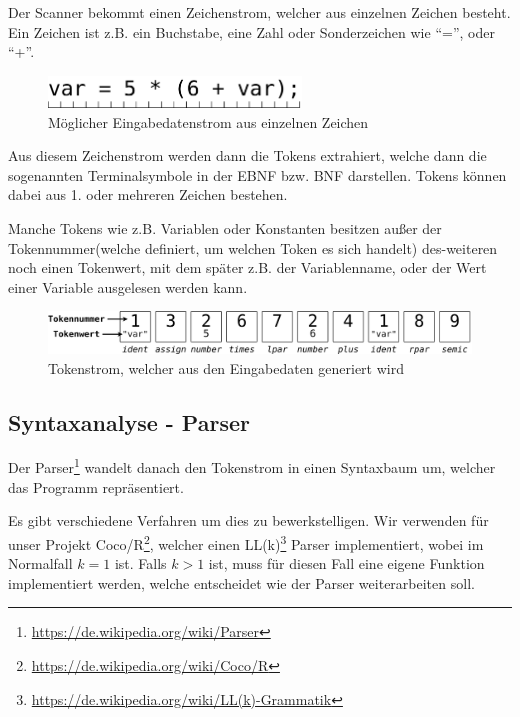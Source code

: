
Der Scanner bekommt einen Zeichenstrom, welcher aus einzelnen Zeichen besteht. Ein Zeichen ist z.B. ein Buchstabe, eine Zahl oder Sonderzeichen wie ``='', oder ``+''.

\begin{figure}[h]
\centering
\includegraphics[width=0.6\textwidth]{./media/images/compiler/input_characterstream.png}
\caption{M\"oglicher Eingabedatenstrom aus einzelnen Zeichen}
\label{compiler_input_characterstream}
\end{figure}


Aus diesem Zeichenstrom werden dann die Tokens extrahiert, welche dann die sogenannten Terminalsymbole in der EBNF bzw. BNF darstellen. Tokens k\"onnen dabei aus 1. oder mehreren Zeichen bestehen.

Manche Tokens wie z.B. Variablen oder Konstanten besitzen au\ss{}er der Tokennummer(welche definiert, um welchen Token es sich handelt) des-weiteren noch einen Tokenwert, mit dem sp\"ater z.B. der Variablenname, oder der Wert einer Variable ausgelesen werden kann.

\begin{figure}[h]
\centering
\includegraphics[width=\textwidth]{./media/images/compiler/scanner_tokenstream.png}
\caption{Tokenstrom, welcher aus den Eingabedaten generiert wird}
\label{compiler_scanner_tokenstream}
\end{figure}

\subsection{Syntaxanalyse - Parser}

Der Parser\footnote{\url{https://de.wikipedia.org/wiki/Parser}} wandelt danach den Tokenstrom in einen Syntaxbaum um, welcher das Programm repräsentiert.

Es gibt verschiedene Verfahren um dies zu bewerkstelligen. Wir verwenden f\"ur unser Projekt Coco/R\footnote{\url{https://de.wikipedia.org/wiki/Coco/R}}, welcher einen LL(k)\footnote{\url{https://de.wikipedia.org/wiki/LL(k)-Grammatik}} Parser implementiert, wobei im Normalfall $k = 1$ ist. Falls $k > 1$ ist, muss f\"ur diesen Fall eine eigene Funktion implementiert werden, welche entscheidet wie der Parser weiterarbeiten soll.

